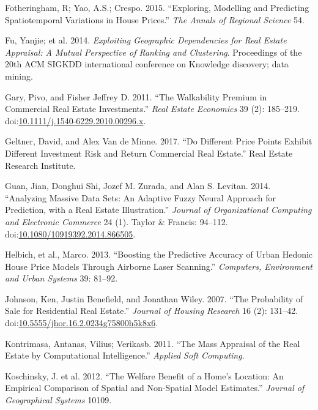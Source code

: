 \documentclass[]{article}
\begin{document}
\hypertarget{ref-Fotheringham2015}{}
Fotheringham, R; Yao, A.S.; Crespo. 2015. ``Exploring, Modelling and
Predicting Spatiotemporal Variations in House Prices.'' \emph{The Annals
of Regional Science} 54.

\hypertarget{ref-Fu2014}{}
Fu, Yanjie; et al. 2014. \emph{Exploiting Geographic Dependencies for
Real Estate Appraisal: A Mutual Perspective of Ranking and Clustering}.
Proceedings of the 20th ACM SIGKDD international conference on Knowledge
discovery; data mining.

\hypertarget{ref-Pivo2011}{}
Gary, Pivo, and Fisher Jeffrey D. 2011. ``The Walkability Premium in
Commercial Real Estate Investments.'' \emph{Real Estate Economics} 39
(2): 185--219.
doi:\href{https://doi.org/10.1111/j.1540-6229.2010.00296.x}{10.1111/j.1540-6229.2010.00296.x}.

\hypertarget{ref-Geltner2017}{}
Geltner, David, and Alex Van de Minne. 2017. ``Do Different Price Points
Exhibit Different Investment Risk and Return Commercial Real Estate.''
Real Estate Research Institute.

\hypertarget{ref-Guan2014}{}
Guan, Jian, Donghui Shi, Jozef M. Zurada, and Alan S. Levitan. 2014.
``Analyzing Massive Data Sets: An Adaptive Fuzzy Neural Approach for
Prediction, with a Real Estate Illustration.'' \emph{Journal of
Organizational Computing and Electronic Commerce} 24 (1). Taylor \&
Francis: 94--112.
doi:\href{https://doi.org/10.1080/10919392.2014.866505}{10.1080/10919392.2014.866505}.

\hypertarget{ref-Helbich2013}{}
Helbich, et al., Marco. 2013. ``Boosting the Predictive Accuracy of
Urban Hedonic House Price Models Through Airborne Laser Scanning.''
\emph{Computers, Environment and Urban Systems} 39: 81--92.

\hypertarget{ref-Johnson2007}{}
Johnson, Ken, Justin Benefield, and Jonathan Wiley. 2007. ``The
Probability of Sale for Residential Real Estate.'' \emph{Journal of
Housing Research} 16 (2): 131--42.
doi:\href{https://doi.org/10.5555/jhor.16.2.0234g75800h5k8x6}{10.5555/jhor.16.2.0234g75800h5k8x6}.

\hypertarget{ref-Kontrimasa2011}{}
Kontrimasa, Antanas, Vilius; Verikasb. 2011. ``The Mass Appraisal of the
Real Estate by Computational Intelligence.'' \emph{Applied Soft
Computing}.

\hypertarget{ref-Koschinsky2012}{}
Koschinsky, J. et al. 2012. ``The Welfare Benefit of a Home's Location:
An Empirical Comparison of Spatial and Non-Spatial Model Estimates.''
\emph{Journal of Geographical Systems} 10109.
\end{document}
